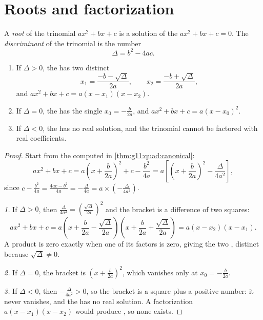 \section{Roots and factorization}

\begin{definition}\label{def:g11:quad:discriminant}
A \emph{root} of the trinomial $ax^2+bx+c$ is a solution of the
 $ax^2 + bx + c = 0$. The \emph{discriminant}
of the trinomial is the number
\[
\Delta = b^2 - 4ac .
\]
\end{definition}

\begin{theorem}[Solving $ax^2+bx+c=0$]\label{thm:g11:quad:roots}
\begin{enumerate}
  \item If $\Delta > 0$, the  has two distinct 
        \[
        x_1 = \frac{-b - \sqrt{\Delta}}{2a},
        \qquad
        x_2 = \frac{-b + \sqrt{\Delta}}{2a},
        \]
        and $ax^2+bx+c = a(x - x_1)(x - x_2)$.
  \item If $\Delta = 0$, the  has the single 
        $x_0 = -\frac{b}{2a}$, and $ax^2+bx+c = a(x - x_0)^2$.
  \item If $\Delta < 0$, the  has no real solution, and the
        trinomial cannot be factored with real coefficients.
\end{enumerate}
\end{theorem}

\begin{proof}
Start from the  computed in \cref{thm:g11:quad:canonical}:
\[
ax^2+bx+c
= a\left(x + \frac{b}{2a}\right)^2 + c - \frac{b^2}{4a}
= a\left[\left(x + \frac{b}{2a}\right)^2 - \frac{\Delta}{4a^2}\right],
\]
since $c - \frac{b^2}{4a} = \frac{4ac - b^2}{4a} = -\frac{\Delta}{4a} =
a \times \left(-\frac{\Delta}{4a^2}\right)$.

\emph{1.} If $\Delta > 0$, then $\frac{\Delta}{4a^2} =
\left(\frac{\sqrt\Delta}{2a}\right)^2$ and the bracket is a difference of
two squares:
\[
ax^2+bx+c = a\left(x + \frac{b}{2a} - \frac{\sqrt\Delta}{2a}\right)
\left(x + \frac{b}{2a} + \frac{\sqrt\Delta}{2a}\right)
= a(x - x_2)(x - x_1).
\]
A product is zero exactly when one of its factors is zero, giving the two
, distinct because $\sqrt\Delta \neq 0$.

\emph{2.} If $\Delta = 0$, the bracket is
$\left(x + \frac{b}{2a}\right)^2$, which vanishes only at
$x_0 = -\frac{b}{2a}$.

\emph{3.} If $\Delta < 0$, then $-\frac{\Delta}{4a^2} > 0$, so the bracket
is a square plus a positive number: it never vanishes, and the  has
no real solution. A factorization $a(x-x_1)(x-x_2)$ would produce , so
none exists.
\end{proof}

